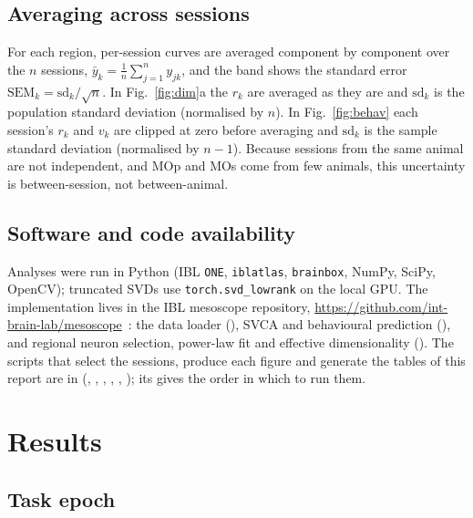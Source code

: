 \documentclass[11pt]{article}
\begin{document}
\subsection{Averaging across sessions}

For each region, per-session curves are averaged component by component over the $n$ sessions, $\bar{y}_k = \frac{1}{n}\sum_{j=1}^{n} y_{jk}$, and the band shows the standard error $\mathrm{SEM}_k = \mathrm{sd}_k / \sqrt{n}$. In Fig.~\ref{fig:dim}a the $r_k$ are averaged as they are and $\mathrm{sd}_k$ is the population standard deviation (normalised by $n$). In Fig.~\ref{fig:behav} each session's $r_k$ and $v_k$ are clipped at zero before averaging and $\mathrm{sd}_k$ is the sample standard deviation (normalised by $n - 1$). Because sessions from the same animal are not independent, and MOp and MOs come from few animals, this uncertainty is between-session, not between-animal.

\subsection{Software and code availability}

Analyses were run in Python (IBL \texttt{ONE}, \texttt{iblatlas}, \texttt{brainbox}, NumPy, SciPy, OpenCV); truncated SVDs use \texttt{torch.svd\_lowrank} on the local GPU. The implementation lives in the IBL mesoscope repository, \url{https://github.com/int-brain-lab/mesoscope}~\cite{mesoscoperepo}: the data loader (), SVCA and behavioural prediction (), and regional neuron selection, power-law fit and effective dimensionality (). The scripts that select the sessions, produce each figure and generate the tables of this report are in  (, , , , , ); its  gives the order in which to run them.

\section{Results}

\subsection{Task epoch}
\end{document}
